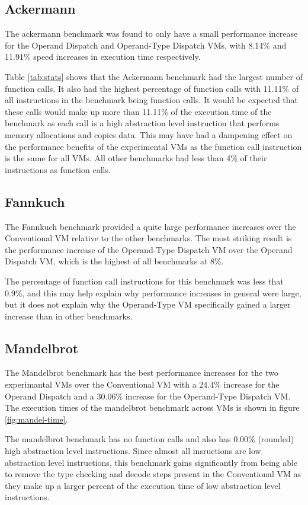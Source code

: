 \documentclass[english,a4paper,12pt]{report}
\begin{document}
\subsection{Ackermann}
The ackermann benchmark was found to only have a small performance
increase for the Operand Dispatch and Operand-Type Dispatch VMs, with
8.14\% and 11.91\% speed increases in execution time respectively.

Table \ref{tab:stats} shows that the Ackermann benchmark had the
largest number of function calls. It also had the highest percentage
of function calls with 11.11\% of all instructions in the benchmark
being function calls. It would be expected that these calls would make
up more than 11.11\% of the execution time of the benchmark as each
call is a high abstraction level instruction that performs memory
allocations and copies data. This may have had a dampening effect on
the performance benefits of the experimental VMs as the function call
instruction is the same for all VMs. All other benchmarks had less
than 4\% of their instructions as function calls.

\subsection{Fannkuch}
The Fannkuch benchmark provided a quite large performance increases
over the Conventional VM relative to the other benchmarks. The most
striking result is the performance increase of the Operand-Type
Dispatch VM over the Operand Dispatch VM, which is the highest of all
benchmarks at 8\%.

The percentage of function call instructions for this benchmark was
less that 0.9\%, and this may help explain why performance increases
in general were large, but it does not explain why the Operand-Type VM
specifically gained a larger increase than in other benchmarks.

\subsection{Mandelbrot}
The Mandelbrot benchmark has the best performance increases for the
two experimantal VMs over the Conventional VM with a 24.4\% increase
for the Operand Dispatch and a 30.06\% increase for the Operand-Type
Dispatch VM. The execution times of the mandelbrot benchmark across
VMs is shown in figure \ref{fig:mandel-time}.

The mandelbrot benchmark has no function calls and also has
0.00\% (rounded) high abstraction level instructions. Since almost all
insructions are low abstraction level instructions, this benchmark
gains significantly from being able to remove the type checking and
decode steps present in the Conventional VM as they make up a larger
percent of the execution time of low abstraction level instructions.
\end{document}
